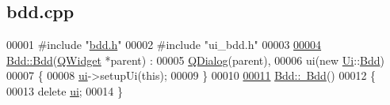 \hypertarget{bdd_8cpp_source}{}\subsection{bdd.\+cpp}

\begin{DoxyCode}
00001 \textcolor{preprocessor}{#include "\hyperlink{bdd_8h}{bdd.h}"}
00002 \textcolor{preprocessor}{#include "ui\_bdd.h"}
00003 
\hyperlink{class_bdd_a9b439e0eaab93fcea818892e1daf809b}{00004} \hyperlink{class_bdd_a9b439e0eaab93fcea818892e1daf809b}{Bdd::Bdd}(\hyperlink{class_q_widget}{QWidget} *parent) :
00005     \hyperlink{class_q_dialog}{QDialog}(parent),
00006     ui(new \hyperlink{namespace_ui}{Ui}::\hyperlink{class_bdd}{Bdd})
00007 \{
00008     \hyperlink{class_bdd_a7d9f43a44caaddb2f5ccd728ecc78c2a}{ui}->setupUi(\textcolor{keyword}{this});
00009 \}
00010 
\hyperlink{class_bdd_a5029277f27f8cfcf9d8603fb331a15dd}{00011} \hyperlink{class_bdd_a5029277f27f8cfcf9d8603fb331a15dd}{Bdd::~Bdd}()
00012 \{
00013     \textcolor{keyword}{delete} \hyperlink{class_bdd_a7d9f43a44caaddb2f5ccd728ecc78c2a}{ui};
00014 \}
\end{DoxyCode}
